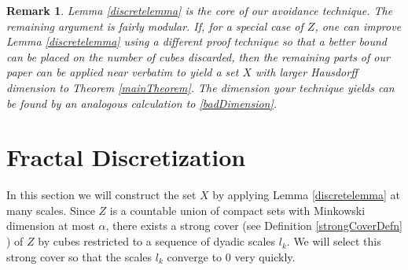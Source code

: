 \documentclass[dvipsnames,letterpaper,12pt]{article}
\numberwithin{equation}{section}
\theoremstyle{plain}
\newtheorem*{remark}{Remark}
\begin{document}

\begin{remark}
	Lemma \ref{discretelemma} is the core of our avoidance technique. The remaining argument is fairly modular. If, for a special case of $Z$, one can improve Lemma \ref{discretelemma} using a different proof technique so that a better bound can be placed on the number of cubes discarded, then the remaining parts of our paper can be applied near verbatim to yield a set $X$ with larger Hausdorff dimension to Theorem \ref{mainTheorem}. The dimension your technique yields can be found by an analogous calculation to \eqref{badDimension}.
\end{remark}










\section{Fractal Discretization}\label{discretizationsection}
In this section we will construct the set $X$ by applying Lemma \ref{discretelemma} at many scales. Since $Z$ is a countable union of compact sets with Minkowski dimension at most $\alpha$, there exists a strong cover (see Definition \ref{strongCoverDefn} ) of $Z$ by cubes restricted to a sequence of dyadic scales $l_k$. We will select this strong cover so that the scales $l_k$ converge to 0 very quickly.
\end{document}
